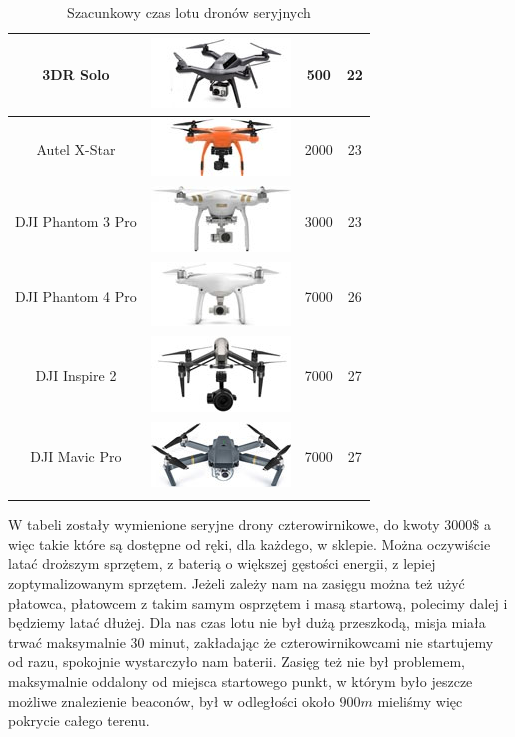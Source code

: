 \begin{longtable}{|c|c|c|c|}
    	    3DR Solo & \includegraphics{zalaczniki/obrazy/drony_miniaturki/3dr-solo.jpg} & 500 & 22 \\ \hline
    	    Autel X-Star & \includegraphics{zalaczniki/obrazy/drony_miniaturki/autel.jpg} & 2000 & 23 \\ \hline
    	    DJI Phantom 3 Pro & \includegraphics{zalaczniki/obrazy/drony_miniaturki/dji-phantom-3-professional.jpg} & 3000 & 23 \\ \hline
    	    DJI Phantom 4 Pro & \includegraphics{zalaczniki/obrazy/drony_miniaturki/DJI-Phantom-4.jpg} & 7000 & 26 \\ \hline
    	    DJI Inspire 2 & \includegraphics{zalaczniki/obrazy/drony_miniaturki/dji_inspire.jpg} & 7000 & 27 \\ \hline
    	    DJI Mavic Pro & \includegraphics{zalaczniki/obrazy/drony_miniaturki/dji_mavic.jpg} & 7000 & 27 \\ \hline
    \caption{Szacunkowy czas lotu dronów seryjnych \cite{szacunkowyczaslotu}}
    \label{tab:czasLotuDronow}
\end{longtable}

W tabeli zostały wymienione seryjne drony czterowirnikowe, do kwoty $3000\$$ a więc takie które są dostępne od ręki, dla każdego, w sklepie. Można oczywiście latać droższym sprzętem, z baterią o większej gęstości energii, z lepiej zoptymalizowanym sprzętem. Jeżeli zależy nam na zasięgu można też użyć płatowca, płatowcem z takim samym osprzętem i masą startową, polecimy dalej i będziemy latać dłużej. Dla nas czas lotu nie był dużą przeszkodą, misja miała trwać maksymalnie 30 minut, zakładając że czterowirnikowcami nie startujemy od razu, spokojnie wystarczyło nam baterii. Zasięg też nie był problemem, maksymalnie oddalony od miejsca startowego punkt, w którym było jeszcze możliwe znalezienie beaconów, był w odległości około $900 m$ mieliśmy więc pokrycie całego terenu.

